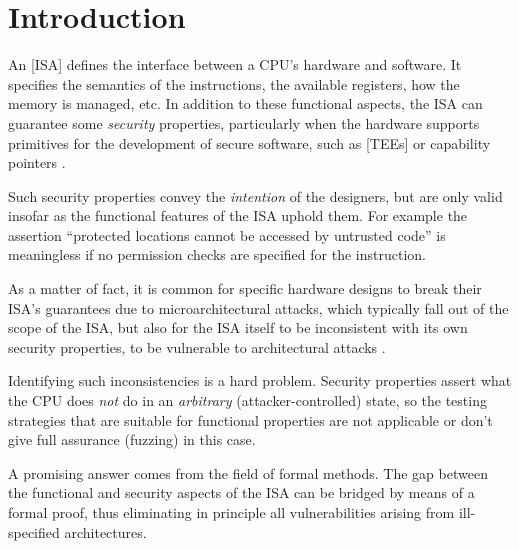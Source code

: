 \chapter{Introduction}

An [ISA] \cite{ArmISA} defines the interface between a CPU's hardware and software. It specifies the semantics of the instructions, the available registers, how the memory is managed, etc. In addition to these functional aspects, the ISA can guarantee some \emph{security} properties, particularly when the hardware supports primitives for the development of secure software, such as [TEEs] \cite{SGX} or capability pointers \cite{Watson2023}.

Such security properties convey the \emph{intention} of the designers, but are only valid insofar as the functional features of the ISA uphold them. For example the assertion ``protected locations cannot be accessed by untrusted code'' is meaningless if no permission checks are specified for the  instruction.

As a matter of fact, it is common for specific hardware designs to break their ISA's guarantees due to microarchitectural attacks, which typically fall out of the scope of the ISA, but also for the ISA itself to be inconsistent with its own security properties, \ie to be vulnerable to architectural attacks \cite{Bognar2024}\cite{Fei2021}.

Identifying such inconsistencies is a hard problem. Security properties assert what the CPU does \emph{not} do in an \emph{arbitrary} (attacker-controlled) state, so the testing strategies that are suitable for functional properties are not applicable or don't give full assurance (\eg fuzzing) in this case.


A promising answer comes from the field of formal methods. The gap between the functional and security aspects of the ISA can be bridged by means of a formal proof, thus eliminating in principle all vulnerabilities arising from ill-specified architectures.


